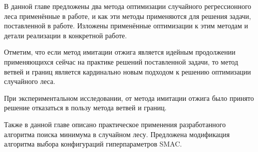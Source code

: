 \chapterconclusion

В данной главе предложены два метода оптимизации случайного регрессионного леса
применённые в работе, и как эти методы применяются для решения задачи,
поставленной в работе. Изложены применённые оптимизации к этим методам и детали
реализации в конкретной работе.

Отметим, что если метод имитации отжига является идейным продолжении
применяющихся сейчас на практике решений поставленной задачи, то метод ветвей
и границ является кардинально новым подходом к решению оптимизации случайного
леса.

При экспериментальном исследовании, от метода имитации отжига было принято решение
отказаться в пользу метода ветвей и границ.

Также в данной главе описано практическое применения разработанного алгоритма
поиска минимума в случайном лесу. Предложена модификация алгоритма выбора
конфигураций гиперпараметров SMAC\@.
